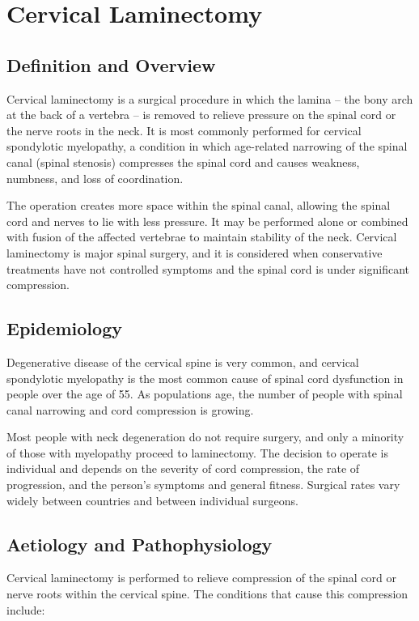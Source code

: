 \chapter{Cervical Laminectomy}

\section*{Definition and Overview}
Cervical laminectomy is a surgical procedure in which the lamina -- the bony arch at the back of a vertebra -- is removed to relieve pressure on the spinal cord or the nerve roots in the neck. It is most commonly performed for cervical spondylotic myelopathy, a condition in which age-related narrowing of the spinal canal (spinal stenosis) compresses the spinal cord and causes weakness, numbness, and loss of coordination.

The operation creates more space within the spinal canal, allowing the spinal cord and nerves to lie with less pressure. It may be performed alone or combined with fusion of the affected vertebrae to maintain stability of the neck. Cervical laminectomy is major spinal surgery, and it is considered when conservative treatments have not controlled symptoms and the spinal cord is under significant compression.

\section*{Epidemiology}
Degenerative disease of the cervical spine is very common, and cervical spondylotic myelopathy is the most common cause of spinal cord dysfunction in people over the age of 55. As populations age, the number of people with spinal canal narrowing and cord compression is growing.

Most people with neck degeneration do not require surgery, and only a minority of those with myelopathy proceed to laminectomy. The decision to operate is individual and depends on the severity of cord compression, the rate of progression, and the person's symptoms and general fitness. Surgical rates vary widely between countries and between individual surgeons.

\section*{Aetiology and Pathophysiology}
Cervical laminectomy is performed to relieve compression of the spinal cord or nerve roots within the cervical spine. The conditions that cause this compression include:

